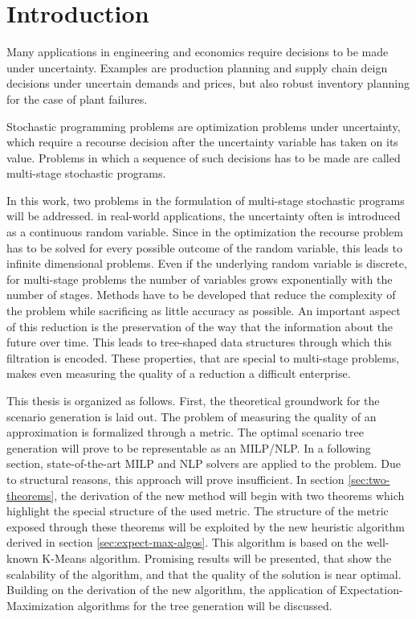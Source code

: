\section{Introduction}
Many applications in engineering and economics require decisions to be made under uncertainty.
Examples are production planning and supply chain deign decisions under uncertain demands and prices, but also robust inventory planning for the case of plant failures.

Stochastic programming problems are optimization problems under uncertainty, which require a recourse decision after the uncertainty variable has taken on its value.
Problems in which a sequence of such decisions has to be made are called multi-stage stochastic programs.

In this work, two problems in the formulation of multi-stage stochastic programs will be addressed.
in real-world applications, the uncertainty often is introduced as a continuous random variable.
Since in the optimization the recourse problem has to be solved for every possible outcome of the random variable, this leads to infinite dimensional problems.
Even if the underlying random variable is discrete, for multi-stage problems the number of variables grows exponentially with the number of stages.
Methods have to be developed that reduce the complexity of the problem while sacrificing as little accuracy as possible.
An important aspect of this reduction is the preservation of the way that the information about the future over time.
This leads to tree-shaped data structures through which this filtration is encoded.
These properties, that are special to multi-stage problems, makes even measuring the quality of a reduction a difficult enterprise.

This thesis is organized as follows.
First, the theoretical groundwork for the scenario generation is laid out.
The problem of measuring the quality of an approximation is formalized through a metric.
The optimal scenario tree generation will prove to be representable as an MILP/NLP.
In a following section, state-of-the-art MILP and NLP solvers are applied to the problem.
Due to structural reasons, this approach will prove insufficient.
In section \ref{sec:two-theorems}, the derivation of the new method will begin with two theorems which highlight the special structure of the used metric.
The structure of the metric exposed through these theorems will be exploited by the new heuristic algorithm derived in section \ref{sec:expect-max-algos}.
This algorithm is based on the well-known K-Means algorithm.
Promising results will be presented, that show the scalability of the algorithm, and that the quality of the solution is near optimal.
Building on the derivation of the new algorithm, the application of Expectation-Maximization algorithms for the tree generation will be discussed.
